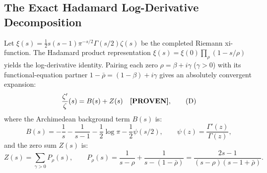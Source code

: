 \documentclass[11pt,a4paper]{article}
\theoremstyle{remark}
\begin{document}
\subsection{The Exact Hadamard Log-Derivative Decomposition}
Let $\xi(s) = \frac{1}{2}s(s-1)\pi^{-s/2}\Gamma(s/2)\zeta(s)$ be the completed Riemann xi-function. The Hadamard product representation $\xi(s) = \xi(0)\prod_\rho (1 - s/\rho)$ yields the log-derivative identity. Pairing each zero $\rho = \beta + i\gamma$ ($\gamma > 0$) with its functional-equation partner $1 - \bar{\rho} = (1 - \beta) + i\gamma$ gives an absolutely convergent expansion:
\begin{equation}
 \frac{\zeta'}{\zeta}(s) = B(s) + Z(s) \quad \text{\textbf{[PROVEN]}}, \tag{D}
\end{equation}
where the Archimedean background term $B(s)$ is:
\begin{equation}
 B(s) = -\frac{1}{s} - \frac{1}{s-1} - \frac{1}{2}\log\pi - \frac{1}{2}\psi(s/2), \qquad \psi(z) = \frac{\Gamma'(z)}{\Gamma(z)},
\end{equation}
and the zero sum $Z(s)$ is:
\begin{equation}
 Z(s) = \sum_{\gamma > 0} P_\rho(s), \qquad P_\rho(s) = \frac{1}{s - \rho} + \frac{1}{s - (1 - \bar{\rho})} = \frac{2s - 1}{(s - \rho)(s - 1 + \bar{\rho})}.
\end{equation}
\end{document}
